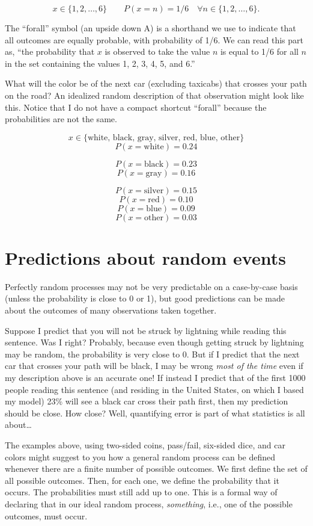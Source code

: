 \documentclass[
  openany]{book}
\begin{document}
\[ x \in \{1, 2, \dots, 6\} \qquad P(x=n) = 1/6 \quad \forall n \in \{1, 2, \dots, 6\}. \]

The ``forall'' symbol (an upside down A) is a shorthand we use to indicate that all outcomes are equally probable, with probability of 1/6. We can read this part as, ``the probability that \(x\) is observed to take the value \(n\) is equal to 1/6 for all \(n\) in the set containing the values 1, 2, 3, 4, 5, and 6.''

What will the color be of the next car (excluding taxicabs) that crosses your path on the road? An idealized random description of that observation might look like this. Notice that I do not have a compact shortcut ``forall'' because the probabilities are not the same.

\[ x \in \{\mbox{white, black, gray, silver, red, blue, other}\} \]
\[ P(x=\mbox{white}) = 0.24 \]

\[ P(x=\mbox{black}) = 0.23 \]
\[P(x=\mbox{gray}) = 0.16 \]

\[P(x=\mbox{silver}) = 0.15 \]
\[P(x=\mbox{red}) = 0.10 \]
\[P(x=\mbox{blue}) = 0.09 \]
\[P(x=\mbox{other}) = 0.03 \]

\hypertarget{predictions-about-random-events}{%
\section{Predictions about random events}\label{predictions-about-random-events}}

Perfectly random processes may not be very predictable on a case-by-case basis (unless the probability is close to 0 or 1), but good predictions can be made about the outcomes of many observations taken together.

Suppose I predict that you will not be struck by lightning while reading this sentence. Was I right? Probably, because even though getting struck by lightning may be random, the probability is very close to 0. But if I predict that the next car that crosses your path will be black, I may be wrong \emph{most of the time} even if my description above is an accurate one! If instead I predict that of the first 1000 people reading this sentence (and residing in the United States, on which I based my model) 23\% will see a black car cross their path first, then my prediction should be close. How close? Well, quantifying error is part of what statistics is all about\ldots{}

The examples above, using two-sided coins, pass/fail, six-sided dice, and car colors might suggest to you how a general random process can be defined whenever there are a finite number of possible outcomes. We first define the set of all possible outcomes. Then, for each one, we define the probability that it occurs. The probabilities must still add up to one. This is a formal way of declaring that in our ideal random process, \emph{something}, i.e., one of the possible outcomes, must occur.
\end{document}

